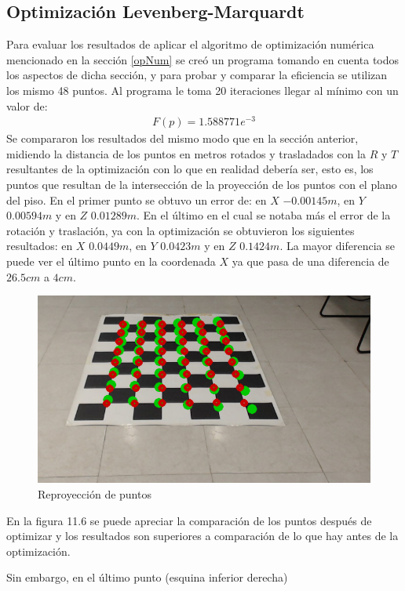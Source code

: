 	\subsection{Optimización Levenberg-Marquardt}
	Para evaluar los resultados de aplicar el algoritmo de optimización numérica mencionado en la sección \ref{opNum} se creó un programa tomando en cuenta todos los aspectos de dicha sección, y para probar y comparar la eficiencia se utilizan los mismo 48 puntos. Al programa le toma 20 iteraciones llegar al mínimo con un valor de:
	\begin{eqnarray}
	F(p)=1.588771e^{-3}
	\end{eqnarray}
	Se compararon los resultados del mismo modo que en la sección anterior, midiendo la distancia de los puntos en metros rotados y trasladados con la $R$ y $T$ resultantes de la optimización con lo que en realidad debería ser, esto es, los puntos que resultan de la intersección de la proyección de los puntos con el plano del piso. En el primer punto se obtuvo un error de: en $X$ $-0.00145m$, en $Y$ $0.00594m$ y en $Z$ $0.01289m$. En el último en el cual se notaba más el error de la rotación y traslación, ya con la optimización se obtuvieron los siguientes resultados: en $X$ $0.0449m$, en $Y$ $0.0423m$ y en $Z$ $0.1424m$. La mayor diferencia se puede ver el último punto en la coordenada $X$ ya que pasa de una diferencia de $26.5cm$ a $4cm$.
	\begin{figure}[htbp]
		\centering
		\includegraphics[width=.5\textwidth]{./pictures/conG0}
		\caption{Reproyección de puntos}\label{fig: figura}
	\end{figure}
	En la figura 11.6 se puede apreciar la comparación de los puntos después de optimizar y los resultados son superiores a comparación de lo que hay antes de la optimización.
	
	Sin embargo, en el último punto (esquina inferior derecha)
	
